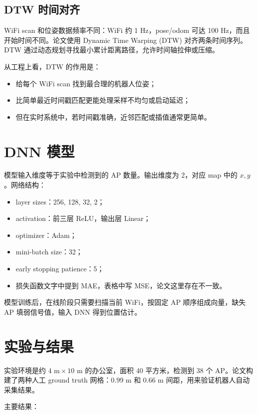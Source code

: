 \documentclass[UTF8,a4paper,12pt]{ctexrep}
\begin{document}
\subsection{DTW 时间对齐}

WiFi scan 和位姿数据频率不同：WiFi 约 1 Hz，pose/odom 可达 100 Hz，而且开始时间不同。论文使用 Dynamic Time Warping (DTW) 对齐两条时间序列。DTW 通过动态规划寻找最小累计距离路径，允许时间轴拉伸或压缩。

从工程上看，DTW 的作用是：

\begin{itemize}
  \item 给每个 WiFi scan 找到最合理的机器人位姿；
  \item 比简单最近时间戳匹配更能处理采样不均匀或启动延迟；
  \item 但在实时系统中，若时间戳准确，近邻匹配或插值通常更简单。
\end{itemize}

\section{DNN 模型}

模型输入维度等于实验中检测到的 AP 数量。输出维度为 2，对应 map 中的 \(x,y\)。网络结构：

\begin{itemize}
  \item layer sizes：256, 128, 32, 2；
  \item activation：前三层 ReLU，输出层 Linear；
  \item optimizer：Adam；
  \item mini-batch size：32；
  \item early stopping patience：5；
  \item 损失函数文字中提到 MAE，表格中写 MSE，论文这里存在不一致。
\end{itemize}

模型训练后，在线阶段只需要扫描当前 WiFi，按固定 AP 顺序组成向量，缺失 AP 填弱信号值，输入 DNN 得到位置估计。

\section{实验与结果}

实验环境是约 \(4\text{ m}\times10\text{ m}\) 的办公室，面积 40 平方米，检测到 38 个 AP。论文构建了两种人工 ground truth 网格：0.99 m 和 0.66 m 间距，用来验证机器人自动采集结果。

主要结果：
\end{document}
